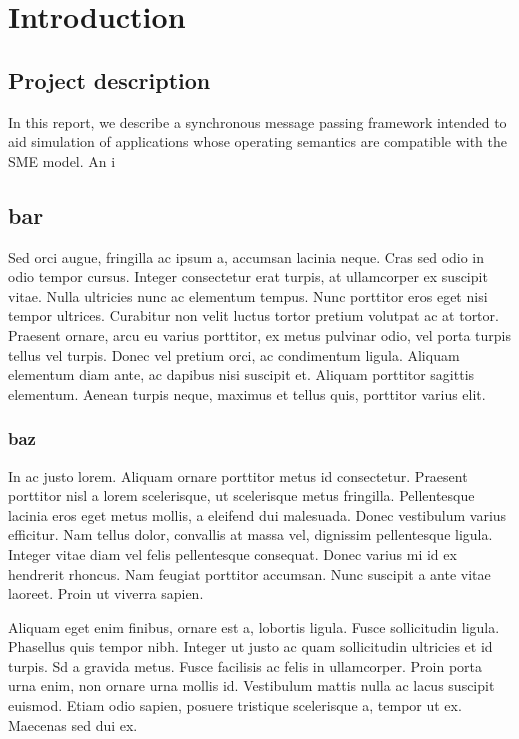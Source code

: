 \chapter{Introduction}

\section{Project description}
In this report, we describe a synchronous message passing framework
intended to aid simulation of applications whose operating semantics
are compatible with the SME model. An i

\section{bar}
Sed orci augue, fringilla ac ipsum a, accumsan lacinia neque. Cras sed odio in odio tempor cursus. Integer consectetur erat turpis, at ullamcorper ex suscipit vitae. Nulla ultricies nunc ac elementum tempus. Nunc porttitor eros eget nisi tempor ultrices. Curabitur non velit luctus tortor pretium volutpat ac at tortor. Praesent ornare, arcu eu varius porttitor, ex metus pulvinar odio, vel porta turpis tellus vel turpis. Donec vel pretium orci, ac condimentum ligula. Aliquam elementum diam ante, ac dapibus nisi suscipit et. Aliquam porttitor sagittis elementum. Aenean turpis neque, maximus et tellus quis, porttitor varius elit.


\subsection{baz}
In ac justo lorem. Aliquam ornare porttitor metus id consectetur. Praesent porttitor nisl a lorem scelerisque, ut scelerisque metus fringilla. Pellentesque lacinia eros eget metus mollis, a eleifend dui malesuada. Donec vestibulum varius efficitur. Nam tellus dolor, convallis at massa vel, dignissim pellentesque ligula. Integer vitae diam vel felis pellentesque consequat. Donec varius mi id ex hendrerit rhoncus. Nam feugiat porttitor accumsan. Nunc suscipit a ante vitae laoreet. Proin ut viverra sapien.

Aliquam eget enim finibus, ornare est a, lobortis ligula. Fusce
sollicitudin ligula. Phasellus quis tempor nibh. Integer ut justo ac
quam sollicitudin ultricies et id turpis. Sd a gravida metus. Fusce facilisis ac felis in ullamcorper. Proin porta urna enim, non ornare urna mollis id. Vestibulum mattis nulla ac lacus suscipit euismod. Etiam odio sapien, posuere tristique scelerisque a, tempor ut ex. Maecenas sed dui ex.


